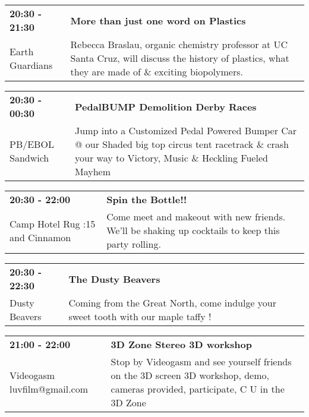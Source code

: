\begin{tabular}{ p{1in} p{2.2in} }
    \textbf{20:30 - 21:30} & \textbf{More than just one word on Plastics} \\
    Earth Guardians \newline  & Rebecca Braslau, organic chemistry professor at UC Santa Cruz, will discuss the history of plastics, what they are made of \& exciting biopolymers. \\
    \hline 
\end{tabular}
    
\begin{tabular}{ p{1in} p{2.2in} }
    \textbf{20:30 - 00:30} & \textbf{PedalBUMP Demolition Derby Races} \\
    PB/EBOL Sandwich \newline  & Jump into a Customized Pedal Powered Bumper Car @ our Shaded big top circus tent racetrack \& crash your way to Victory, Music \& Heckling Fueled Mayhem \\
    \hline 
\end{tabular}
    
\begin{tabular}{ p{1in} p{2.2in} }
    \textbf{20:30 - 22:00} & \textbf{Spin the Bottle!!} \\
    Camp Hotel Rug \newline 8:15 and Cinnamon & Come meet and makeout with new friends.  We'll be shaking up cocktails to keep this party rolling. \\
    \hline 
\end{tabular}
    
\begin{tabular}{ p{1in} p{2.2in} }
    \textbf{20:30 - 22:30} & \textbf{The Dusty Beavers} \\
    Dusty Beavers \newline  & Coming from the Great North, come indulge your sweet tooth with our maple taffy ! \\
    \hline 
\end{tabular}
    
\begin{tabular}{ p{1in} p{2.2in} }
    \textbf{21:00 - 22:00} & \textbf{3D Zone Stereo 3D workshop } \\
    Videogasm \newline luvfilm@gmail.com & Stop by Videogasm and see yourself friends on the 3D screen  3D workshop, demo, cameras provided, participate, C U in the 3D Zone \\
    \hline 
\end{tabular}
    

